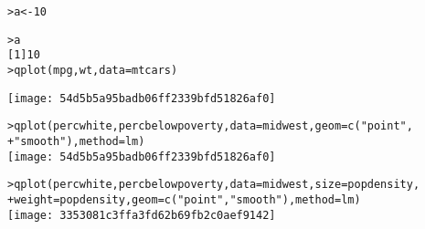 \documentclass[letterpaper]{scrartcl}
\begin{document}
%
\begin{alltt}


> a <- 10 

> a 
[1] 10
> qplot(mpg, wt, data=mtcars) 

\texttt{[image: 54d5b5a95badb06ff2339bfd51826af0]}

\end{alltt}

\begin{alltt}
> qplot(percwhite, percbelowpoverty, data = midwest, geom = c("point", 
+     "smooth"), method = lm)
\texttt{[image: 54d5b5a95badb06ff2339bfd51826af0]}

> qplot(percwhite, percbelowpoverty, data = midwest, size = popdensity, 
+     weight = popdensity, geom = c("point", "smooth"), method = lm)
\texttt{[image: 3353081c3ffa3fd62b69fb2c0aef9142]}

\end{alltt}

    
\end{document}
